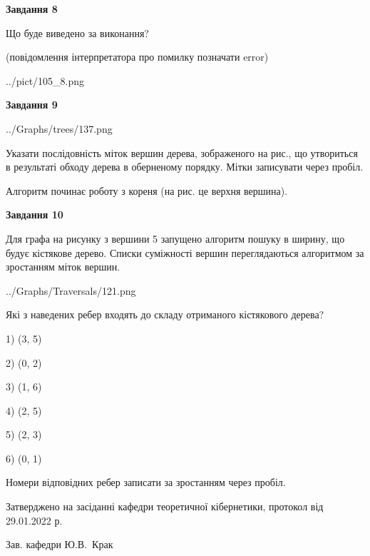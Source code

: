 \documentclass[12pt, ukrainian]{article}
\begin{document}
{\begin {large}
{\begin {center}\textbf{Завдання 8}\end {center}}\par
Що буде виведено за виконання?\par
 (повідомлення інтерпретатора про помилку позначати error)\par
\begin{center}
	{../pict/105_8.png}
\end{center}
\newpage

{\begin {center}\textbf{Завдання 9}\end {center}}\par

\begin{center}
	{../Graphs/trees/137.png}
\end{center}
Указати послідовність міток вершин дерева, зображеного на рис., що утвориться в результаті обходу дерева в оберненому порядку. Мітки записувати через пробіл.\par Алгоритм починає роботу з кореня (на рис. це верхня вершина).\par
\newpage

{\begin {center}\textbf{Завдання 10}\end {center}}\par
Для графа на рисунку з вершини 5 запущено алгоритм пошуку в ширину, що будує кістякове дерево. Списки суміжності вершин переглядаються алгоритмом за зростанням міток вершин.\par
\begin{center}
	{../Graphs/Traversals/121.png}
\end{center}
\par Які з наведених ребер входять до складу отриманого кістякового дерева?\par
1) (3, 5)\par
2) (0, 2)\par
3) (1, 6)\par
4) (2, 5)\par
5) (2, 3)\par
6) (0, 1)\par
{\vskip 15pt} Номери відповідних ребер записати за зростанням через пробіл.\par
\newpage


\end {large}
}
{\smallskip \begin {small} Затверджено на засіданні кафедри теоретичної кібернетики, протокол  від   29.01.2022 р.\par\smallskip\smallskip
{\parbox {6.5 cm}{Зав. кафедри \dotfill Ю.В.~Крак}} \end{small}}
\end{document}
